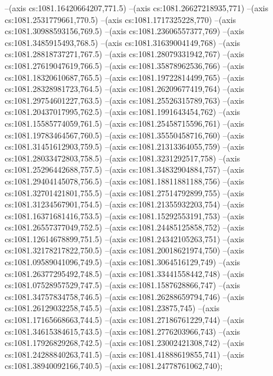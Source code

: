 --(axis cs:1081.16420664207,771.5)
--(axis cs:1081.26627218935,771)
--(axis cs:1081.2531779661,770.5)
--(axis cs:1081.1717325228,770)
--(axis cs:1081.30988593156,769.5)
--(axis cs:1081.23606557377,769)
--(axis cs:1081.3485915493,768.5)
--(axis cs:1081.31639004149,768)
--(axis cs:1081.28818737271,767.5)
--(axis cs:1081.28079331942,767)
--(axis cs:1081.27619047619,766.5)
--(axis cs:1081.35878962536,766)
--(axis cs:1081.18320610687,765.5)
--(axis cs:1081.19722814499,765)
--(axis cs:1081.28328981723,764.5)
--(axis cs:1081.26209677419,764)
--(axis cs:1081.29754601227,763.5)
--(axis cs:1081.25526315789,763)
--(axis cs:1081.20437017995,762.5)
--(axis cs:1081.1991643454,762)
--(axis cs:1081.15585774059,761.5)
--(axis cs:1081.25458715596,761)
--(axis cs:1081.19783464567,760.5)
--(axis cs:1081.35550458716,760)
--(axis cs:1081.31451612903,759.5)
--(axis cs:1081.21313364055,759)
--(axis cs:1081.28033472803,758.5)
--(axis cs:1081.3231292517,758)
--(axis cs:1081.25296442688,757.5)
--(axis cs:1081.34832904884,757)
--(axis cs:1081.29404145078,756.5)
--(axis cs:1081.18811881188,756)
--(axis cs:1081.32701421801,755.5)
--(axis cs:1081.27514792899,755)
--(axis cs:1081.31234567901,754.5)
--(axis cs:1081.21355932203,754)
--(axis cs:1081.16371681416,753.5)
--(axis cs:1081.15292553191,753)
--(axis cs:1081.26557377049,752.5)
--(axis cs:1081.24485125858,752)
--(axis cs:1081.12614678899,751.5)
--(axis cs:1081.24342105263,751)
--(axis cs:1081.32178217822,750.5)
--(axis cs:1081.20018621974,750)
--(axis cs:1081.09589041096,749.5)
--(axis cs:1081.3064516129,749)
--(axis cs:1081.26377295492,748.5)
--(axis cs:1081.33441558442,748)
--(axis cs:1081.07528957529,747.5)
--(axis cs:1081.1587628866,747)
--(axis cs:1081.34757834758,746.5)
--(axis cs:1081.26288659794,746)
--(axis cs:1081.26129032258,745.5)
--(axis cs:1081.23875,745)
--(axis cs:1081.17165668663,744.5)
--(axis cs:1081.27186761229,744)
--(axis cs:1081.34615384615,743.5)
--(axis cs:1081.2776203966,743)
--(axis cs:1081.17926829268,742.5)
--(axis cs:1081.23002421308,742)
--(axis cs:1081.24288840263,741.5)
--(axis cs:1081.41888619855,741)
--(axis cs:1081.38940092166,740.5)
--(axis cs:1081.24778761062,740);
